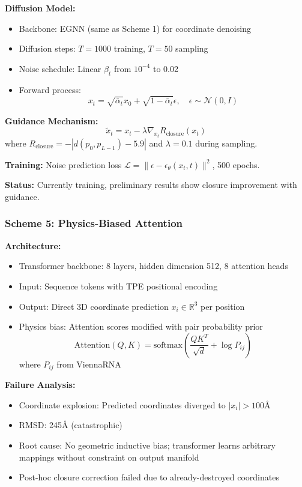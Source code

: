 \documentclass[12pt]{article}
\begin{document}
\textbf{Diffusion Model:}
\begin{itemize}
\item Backbone: EGNN (same as Scheme 1) for coordinate denoising
\item Diffusion steps: $T=1000$ training, $T=50$ sampling
\item Noise schedule: Linear $\beta_t$ from $10^{-4}$ to 0.02
\item Forward process:
\begin{equation}
x_t = \sqrt{\bar{\alpha}_t} x_0 + \sqrt{1-\bar{\alpha}_t} \epsilon, \quad \epsilon \sim \mathcal{N}(0, I)
\end{equation}
\end{itemize}

\textbf{Guidance Mechanism:}
\begin{equation}
\tilde{x}_t = x_t - \lambda \nabla_{x_t} R_{\text{closure}}(x_t)
\end{equation}
where $R_{\text{closure}} = -|d(p_0, p_{L-1}) - 5.9|$ and $\lambda=0.1$ during sampling.

\textbf{Training:} Noise prediction loss $\mathcal{L} = \|\epsilon - \epsilon_\theta(x_t, t)\|^2$, 500 epochs.

\textbf{Status:} Currently training, preliminary results show closure improvement with guidance.

\subsubsection{Scheme 5: Physics-Biased Attention}

\textbf{Architecture:}
\begin{itemize}
\item Transformer backbone: 8 layers, hidden dimension 512, 8 attention heads
\item Input: Sequence tokens with TPE positional encoding
\item Output: Direct 3D coordinate prediction $x_i \in \mathbb{R}^3$ per position
\item Physics bias: Attention scores modified with pair probability prior
\begin{equation}
\text{Attention}(Q, K) = \text{softmax}\left(\frac{QK^T}{\sqrt{d}} + \log P_{ij}\right)
\end{equation}
where $P_{ij}$ from ViennaRNA
\end{itemize}

\textbf{Failure Analysis:}
\begin{itemize}
\item Coordinate explosion: Predicted coordinates diverged to $|x_i| > 100$Å
\item RMSD: 245Å (catastrophic)
\item Root cause: No geometric inductive bias; transformer learns arbitrary mappings without constraint on output manifold
\item Post-hoc closure correction failed due to already-destroyed coordinates
\end{itemize}
\end{document}
